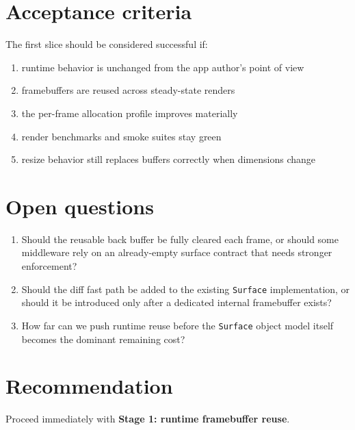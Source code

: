 \section{Acceptance criteria}\label{record-052-acceptance-criteria}

The first slice should be considered successful if:

\begin{enumerate}
\def\labelenumi{\arabic{enumi}.}
\tightlist
\item
  runtime behavior is unchanged from the app author's point of view
\item
  framebuffers are reused across steady-state renders
\item
  the per-frame allocation profile improves materially
\item
  render benchmarks and smoke suites stay green
\item
  resize behavior still replaces buffers correctly when dimensions change
\end{enumerate}

\section{Open questions}\label{record-052-open-questions}

\begin{enumerate}
\def\labelenumi{\arabic{enumi}.}
\tightlist
\item
  Should the reusable back buffer be fully cleared each frame, or should some middleware rely on an already-empty surface contract that needs stronger enforcement?
\item
  Should the diff fast path be added to the existing \texttt{S\allowbreak{}u\allowbreak{}r\allowbreak{}f\allowbreak{}a\allowbreak{}c\allowbreak{}e} implementation, or should it be introduced only after a dedicated internal framebuffer exists?
\item
  How far can we push runtime reuse before the \texttt{S\allowbreak{}u\allowbreak{}r\allowbreak{}f\allowbreak{}a\allowbreak{}c\allowbreak{}e} object model itself becomes the dominant remaining cost?
\end{enumerate}

\section{Recommendation}\label{record-052-recommendation}

Proceed immediately with \textbf{Stage 1: runtime framebuffer reuse}.

